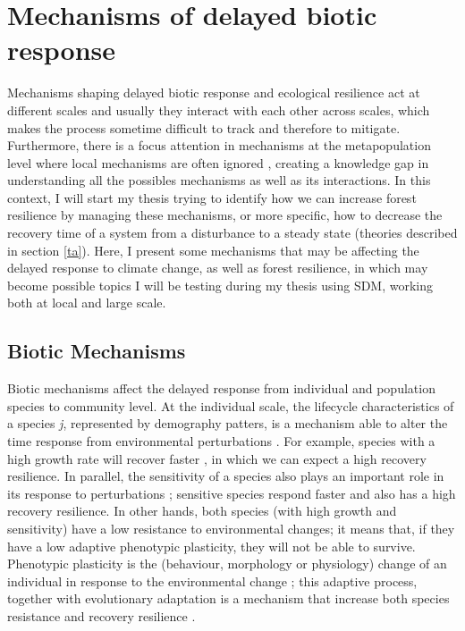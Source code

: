 \section{Mechanisms of delayed biotic response}

Mechanisms shaping delayed biotic response and ecological resilience\footnotemark{} act at different scales and usually they interact with each other across scales, which makes the process sometime difficult to track and therefore to mitigate.
Furthermore, there is a focus attention in mechanisms at the metapopulation level where local mechanisms are often ignored \citep{Hylander2013}, creating a knowledge gap in understanding all the possibles mechanisms as well as its interactions.
In this context, I will start my thesis trying to identify how we can increase forest resilience by managing these mechanisms, or more specific, how to decrease the recovery time of a system from a disturbance to a steady state (theories described in section \ref{ta}).
Here, I present some mechanisms that may be affecting the delayed response to climate change, as well as forest resilience, in which may become possible topics I will be testing during my thesis using SDM, working both at local and large scale.


\subsection{Biotic Mechanisms}

Biotic mechanisms affect the delayed response from individual and population species to community level.
At the individual scale, the lifecycle characteristics of a species \textit{j}, represented by demography patters, is a mechanism able to alter the time response from environmental perturbations \citep{Bertrand2016}.
For example, species with a high growth rate will recover faster \citep{Grman2010}, in which we can expect a high recovery resilience.
In parallel, the sensitivity of a species also plays an important role in its response to perturbations \citep{Oliver2015,Bertrand2016}; sensitive species respond faster and also has a high recovery resilience.
In other hands, both species (with high growth and sensitivity) have a low resistance to environmental changes; it means that, if they have a low adaptive phenotypic plasticity, they will not be able to survive.
Phenotypic plasticity is the (behaviour, morphology or physiology) change of an individual in response to the environmental change \citep{Price2003}; this adaptive process, together with evolutionary adaptation \citep{Bertrand2016} is a mechanism that increase both species resistance and recovery resilience \citep{Essl2015,Oliver2015}.

